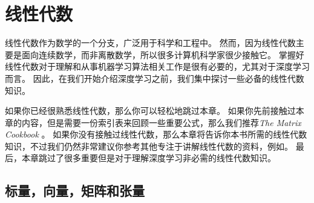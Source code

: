 \chapter{线性代数}
\label{chap:linear_algebra}

线性代数作为数学的一个分支，广泛用于科学和工程中。
然而，因为线性代数主要是面向连续数学，而非离散数学，所以很多计算机科学家很少接触它。
掌握好线性代数对于理解和从事机器学习算法相关工作是很有必要的，尤其对于深度学习而言。
因此，在我们开始介绍深度学习之前，我们集中探讨一些必备的线性代数知识。


如果你已经很熟悉线性代数，那么你可以轻松地跳过本章。
如果你先前接触过本章的内容，但是需要一份索引表来回顾一些重要公式，那么我们推荐\emph{The Matrix Cookbook} \citep{matrix-cookbook}。
如果你没有接触过线性代数，那么本章将告诉你本书所需的线性代数知识，不过我们仍然非常建议你参考其他专注于讲解线性代数的资料，例如\cite{shilov1977linear}。
最后，本章跳过了很多重要但是对于理解深度学习非必需的线性代数知识。




\section{标量，向量，矩阵和张量}
\label{sec:scalars_vectors_matrices_and_tensors}

